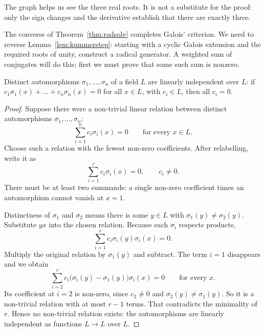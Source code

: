 The graph helps us see the three real roots. It is not a substitute for the proof: only the sign changes and the derivative establish that there are exactly three.

The converse of Theorem~\ref{thm:radsolv} completes Galois' criterion.
We need to reverse Lemma~\ref{lem:kummerstep}: starting with a cyclic Galois
extension and the required roots of unity, construct a radical generator.
A weighted sum of conjugates will do this; first we must prove that some
such sum is nonzero.

\begin{lemma}[Dedekind]\label{lem:dedekind}
Distinct automorphisms $\sigma_1,\dots,\sigma_n$ of a field $L$ are linearly independent over $L$: if $c_1\sigma_1(x)+\dots+c_n\sigma_n(x)=0$ for all $x\in L$, with $c_i\in L$, then all $c_i=0$.
\end{lemma}
\begin{proof}
Suppose there were a non-trivial
linear relation between distinct
automorphisms $\sigma_1,\ldots,\sigma_n$:
\[
\sum_{i=1}^n c_i\sigma_i(x)=0
\qquad\text{for every }x\in L.
\]
Choose such a relation with the
fewest non-zero coefficients.
After relabelling, write it as
\[
\sum_{i=1}^r c_i\sigma_i(x)=0,
\qquad c_i\ne0.
\]
There must be at least two summands:
a single non-zero coefficient times
an automorphism cannot vanish at $x=1$.

Distinctness of $\sigma_1$ and $\sigma_2$
means there is some $y\in L$ with
$\sigma_1(y)\ne\sigma_2(y)$.
Substitute $yx$ into the chosen relation.
Because each $\sigma_i$ respects products,
\[
\sum_{i=1}^r
c_i\sigma_i(y)\sigma_i(x)=0.
\]
Multiply the original relation by
$\sigma_1(y)$ and subtract. The term
$i=1$ disappears and we obtain
\[
\sum_{i=2}^r
c_i\bigl(\sigma_i(y)-\sigma_1(y)\bigr)
\sigma_i(x)=0
\qquad\text{for every }x.
\]
Its coefficient at $i=2$ is non-zero,
since $c_2\ne0$ and
$\sigma_2(y)\ne\sigma_1(y)$.
So it is a non-trivial relation
with at most $r-1$ terms.
That contradicts the minimality of $r$.
Hence no non-trivial relation exists:
the automorphisms are linearly independent
as functions $L\to L$ over $L$.
\end{proof}

